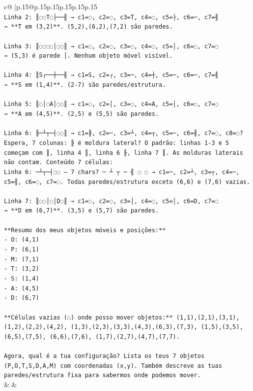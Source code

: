 \documentclass{article}
\begin{document}
{\begin{supertabular}{c@{$\;$}|p{.15\linewidth}@{}p{.15\linewidth}p{.15\linewidth}p{.15\linewidth}p{.15\linewidth}p{.15\linewidth}}
{{{\\ 
\texttt{Linha 2: ║◌◌T◌├──╢ → c1=◌, c2=◌, c3=T, c4=◌, c5=├, c6=─, c7=╢} \\
\texttt{→ **T em (3,2)**. (5,2),(6,2),(7,2) são paredes.} \\
\\ 
\texttt{Linha 3: ║◌◌◌◌│◌◌║ → c1=◌, c2=◌, c3=◌, c4=◌, c5=│, c6=◌, c7=◌} \\
\texttt{→ (5,3) é parede │. Nenhum objeto móvel visível.} \\
\\ 
\texttt{Linha 4: ║S┌──┼──╢ → c1=S, c2=┌, c3=─, c4=┼, c5=─, c6=─, c7=╢} \\
\texttt{→ **S em (1,4)**. (2{-}7) são paredes/estrutura.} \\
\\ 
\texttt{Linha 5: ║◌│◌A│◌◌║ → c1=◌, c2=│, c3=◌, c4=A, c5=│, c6=◌, c7=◌} \\
\texttt{→ **A em (4,5)**. (2,5) e (5,5) são paredes.} \\
\\ 
\texttt{Linha 6: ╟─┴┬─┤◌◌║ → c1=╟, c2=─, c3=┴, c4=┬, c5=─, c6=╢, c7=◌, c8=◌? Espera, 7 colunas: ╟ é moldura lateral? O padrão: linhas 1{-}3 e 5 começam com ║, linha 4 ║, linha 6 ╟, linha 7 ║. As molduras laterais não contam. Conteúdo 7 células:} \\
\texttt{Linha 6: ─┴┬─┤◌◌ — 7 chars? ─ ┴ ┬ ─ ╢ ◌ ◌ → c1=─, c2=┴, c3=┬, c4=─, c5=╢, c6=◌, c7=◌. Todas paredes/estrutura exceto (6,6) e (7,6) vazias.} \\
\\ 
\texttt{Linha 7: ║◌◌│◌│D◌║ → c1=◌, c2=◌, c3=│, c4=◌, c5=│, c6=D, c7=◌} \\
\texttt{→ **D em (6,7)**. (3,5) e (5,7) são paredes.} \\
\\ 
\texttt{**Resumo dos meus objetos móveis e posições:**} \\
\texttt{{-} O: (4,1)} \\
\texttt{{-} P: (6,1)} \\
\texttt{{-} M: (7,1)} \\
\texttt{{-} T: (3,2)} \\
\texttt{{-} S: (1,4)} \\
\texttt{{-} A: (4,5)} \\
\texttt{{-} D: (6,7)} \\
\\ 
\texttt{**Células vazias (◌) onde posso mover objetos:** (1,1),(2,1),(3,1), (1,2),(2,2),(4,2), (1,3),(2,3),(3,3),(4,3),(6,3),(7,3), (1,5),(3,5),(6,5),(7,5), (6,6),(7,6), (1,7),(2,7),(4,7),(7,7).} \\
\\ 
\texttt{Agora, qual é a tua configuração? Lista os teus 7 objetos (P,O,T,S,D,A,M) com coordenadas (x,y). Também descreve as tuas paredes/estrutura fixa para sabermos onde podemos mover.} \\
            }
        }
    }
    & & \\ \\


\end{supertabular}}
\end{document}
